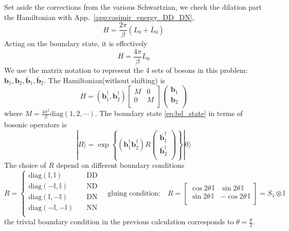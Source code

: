 \documentclass{article}
\renewcommand{\vec}[1]{\boldsymbol{\mathbf{#1}}}
\begin{document}


Set aside the corrections from the various Schwartzian, we check the dilation part the Hamiltonian with App.~\ref{app:casimir_energy_DD_DN}, 
\begin{equation}
H =  \frac{2\pi }{\beta} ( L_0 + \bar{L}_0 )
\end{equation}
Acting on the boundary state, it is effectively
\begin{equation}
H = \frac{4\pi}{\beta} L_0 
\end{equation}
We use the matrix notation to represent the 4 sets of bosons in this problem: $\vec{b}_1, \vec{b}_2, \bar{\vec{b}}_1, \bar{\vec{b}}_2$. The Hamiltonian(without shifting) is
\begin{equation}
H = ( \vec{b}_1^{\dagger}, \vec{b}_2^{\dagger}) 
\begin{bmatrix}
M & 0 \\
0& M \\                                                
\end{bmatrix} 
\begin{pmatrix}
\vec{b }_1\\
\vec{b }_2 \\
\end{pmatrix}
\end{equation}
where $M = \frac{4\pi^2}{\beta} \text{diag}(1,2,\cdots )$. The boundary state \eqref{eq:bd_state} in terms of bosonic operators is
\begin{equation}
  |B \rangle = \exp\left\{ ( \vec{b}^{\dagger}_1 \vec{b}^{\dagger}_2 ) R  
\begin{pmatrix}
  \bar{\vec{b}}^{\dagger}_1\\
  \bar{\vec{b}}^{\dagger}_2\\
\end{pmatrix}\right\}  | 0 \rangle 
\end{equation}
The choice of $R$ depend on different boundary conditions
\begin{equation}
\label{eq:R-bs}
R =
\left\lbrace
\begin{aligned}
   \text{diag}( \mathbb{I}, \mathbb{I} )  &  \quad \text{DD} \\
   \text{diag}( -\mathbb{I}, \mathbb{I} )  &  \quad \text{ND} \\
   \text{diag}( \mathbb{I}, -\mathbb{I} )  &  \quad \text{DN} \\
   \text{diag}( -\mathbb{I}, -\mathbb{I} )  &  \quad \text{NN} \\
\end{aligned} \right.  
\quad
\text{gluing condition:}\quad 
R = 
\begin{bmatrix}
\cos 2 \theta \, \mathbb{I} &  \sin 2 \theta \, \mathbb{I} \\
 \sin 2 \theta \, \mathbb{I}& -\cos 2\theta \, \mathbb{I}\\  
\end{bmatrix} = S_1 \otimes \mathbb{I} 
\end{equation}
the trivial boundary condition in the previous calculation corresponds to $\theta = \frac{\theta}{2}$. 
\end{document}
